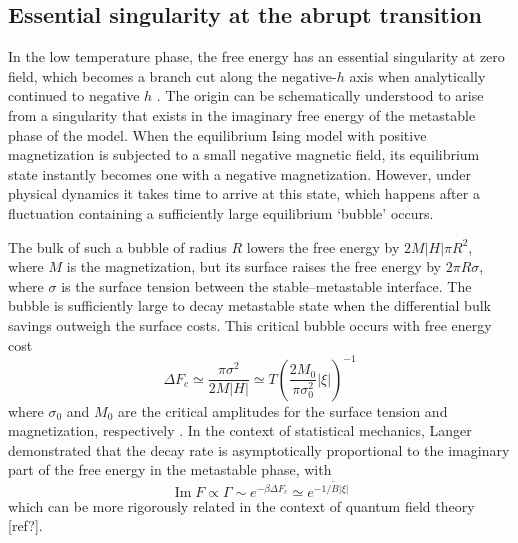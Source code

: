 \documentclass[
  aps,
  pre,
  preprint,
  longbibliography,
  floatfix
]{revtex4-2}
\begin{document}
\subsection{Essential singularity at the abrupt transition}

In the low temperature phase, the free energy has an essential singularity at
zero field, which becomes a branch cut along the negative-$h$ axis when
analytically continued to negative $h$ \cite{Langer_1967_Theory}. The origin
can be schematically understood to arise from a singularity that exists in the
imaginary free energy of the metastable phase of the model. When the
equilibrium Ising model with positive magnetization is subjected to a small
negative magnetic field, its equilibrium state instantly becomes one with a
negative magnetization. However, under physical dynamics it takes time to
arrive at this state, which happens after a fluctuation containing a
sufficiently large equilibrium `bubble' occurs.

The bulk of such a bubble of radius $R$ lowers the free energy by $2M|H|\pi
R^2$, where  $M$ is the magnetization, but its surface raises the free energy
by $2\pi R\sigma$, where $\sigma$ is the surface tension between the
stable--metastable interface. The bubble is sufficiently large to decay
metastable state when the differential bulk savings outweigh the surface costs.
This critical bubble occurs with free energy cost
\begin{equation}
  \Delta F_c
    \simeq\frac{\pi\sigma^2}{2M|H|}
    \simeq T\left(\frac{2M_0}{\pi\sigma_0^2}|\xi|\right)^{-1}
\end{equation}
where $\sigma_0$ and $M_0$ are the critical amplitudes for the surface tension
and magnetization, respectively \cite{Kent-Dobias_2020_Novel}.  In the context
of statistical mechanics, Langer demonstrated that the decay rate is
asymptotically proportional to the imaginary part of the free energy in the
metastable phase, with
\begin{equation}
  \operatorname{Im}F\propto\Gamma\sim e^{-\beta\Delta F_c}\simeq e^{-1/\tilde B|\xi|}
\end{equation}
which can be more rigorously related in the context of quantum field theory [ref?].
\end{document}
